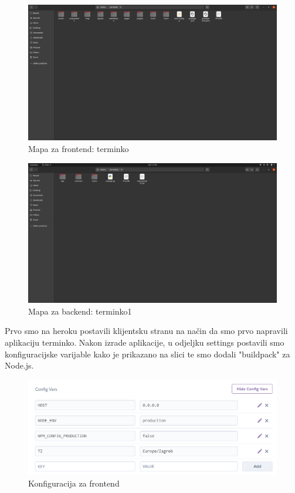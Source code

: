 			\begin{figure}[H]
				\centering
				\includegraphics[scale=0.25]{slike/FrontendMapa.PNG}
				\caption{Mapa za frontend: terminko}
				\label{fig:promjene}
			\end{figure}
			
			\begin{figure}[H]
				\centering
				\includegraphics[scale=0.25]{slike/BackendMapa.PNG}
				\caption{Mapa za backend: terminko1}
				\label{fig:promjene}
			\end{figure}
		
			Prvo smo na heroku postavili klijentsku stranu na način da smo prvo napravili aplikaciju terminko. Nakon izrade aplikacije, u odjeljku settings postavili smo konfiguracijske varijable kako je prikazano na slici te smo dodali "buildpack" za Node.js.
			
			\begin{figure}[H]
				\centering
				\includegraphics[scale=0.65]{slike/KonfiguracijaFrontend.PNG}
				\caption{Konfiguracija za frontend}
				\label{fig:promjene}
			\end{figure}
		
